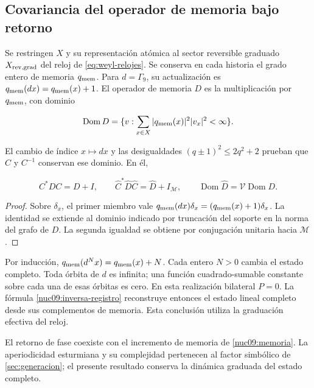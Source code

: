 \subsection{Covariancia del operador de memoria bajo retorno}

Se restringen \(X\) y su representación atómica al sector reversible
graduado \(X_{\rm rev,grad}\) del reloj de
\eqref{eq:weyl-relojes}. Se conserva en cada historia el grado entero
de memoria \(q_{\rm mem}\). Para \(d=\Gamma_9\), su actualización es
\(q_{\rm mem}(dx)=q_{\rm mem}(x)+1\).
El operador de memoria \(D\) es la multiplicación por
\(q_{\rm mem}\), con dominio



\[
\operatorname{Dom}D=\{v:\sum_{x\in X}|q_{\rm mem}(x)|^2|v_x|^2<\infty\}.
\]



El cambio de índice \(x\mapsto dx\) y las desigualdades
\((q\pm1)^2\le2q^2+2\) prueban que \(C\) y \(C^{-1}\)
conservan ese dominio. En él,



\begin{equation}
C^*DC=D+I,\qquad
\widehat C^*\widehat D\widehat C=\widehat D+I_{\mathcal M},
\qquad\operatorname{Dom}\widehat D=\mathcal V\operatorname{Dom}D.
\label{nuc09:memoria}
\end{equation}



\begin{proof}
Sobre \(\delta_x\), el primer miembro vale
\(q_{\rm mem}(dx)\delta_x=(q_{\rm mem}(x)+1)\delta_x\).
La identidad se extiende al dominio indicado por truncación del
soporte en la norma del grafo de \(D\).
La segunda igualdad se obtiene por conjugación unitaria hacia
\(\mathcal M\).
\end{proof}

Por inducción,
\(q_{\rm mem}(d^Nx)=q_{\rm mem}(x)+N\).
Cada entero \(N>0\) cambia el estado completo.
Toda órbita de \(d\) es infinita; una función cuadrado-sumable
constante sobre cada una de esas órbitas es cero.
En esta realización bilateral \(P=0\).
La fórmula \eqref{nuc09:inversa-registro} reconstruye entonces
el estado lineal completo desde sus complementos de memoria.
Esta conclusión utiliza la graduación efectiva del reloj.

El retorno de fase coexiste con el incremento de memoria de
\eqref{nuc09:memoria}.
La aperiodicidad esturmiana y su complejidad pertenecen al factor
simbólico de \cref{sec:generacion}; el presente resultado conserva
la dinámica graduada del estado completo.

